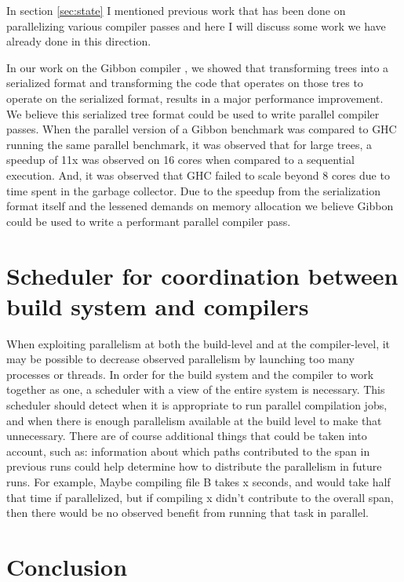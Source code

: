 \documentclass[10pt]{article}
\begin{document}

In section \ref{sec:state} I mentioned previous work that has been done on parallelizing various compiler
passes and here I will discuss some work we have already done in this direction. 

In our work on the Gibbon compiler \cite{vollmer2017compiling}, we showed that transforming trees into a serialized
format and transforming the code that operates on those tres to operate on the serialized format,
results in a major performance improvement.  We believe this serialized tree format could be used to
write parallel compiler passes.  When the parallel version of a Gibbon benchmark was compared to
GHC running the same parallel benchmark, it was observed that for large trees, a speedup of
11x was observed on 16 cores when compared to a sequential execution.  And, it was observed that GHC
failed to scale beyond 8 cores due to time spent in the garbage collector.  Due to the speedup from
the serialization format itself and the lessened demands on memory allocation we believe Gibbon
could be used to write a performant parallel compiler pass.


\section{Scheduler for coordination between build system and compilers}

When exploiting parallelism at both the build-level and at the compiler-level, it may be possible to
decrease observed parallelism by launching too many processes or threads.  In order for the build
system and the compiler to work together as one, a scheduler with a view of the entire system
is necessary.  This scheduler should detect when it is appropriate to run parallel compilation
jobs, and when there is enough parallelism available at the build level to make that unnecessary.
There are of course additional things that could be taken into account, such as: information about which
paths contributed to the span in previous runs could help determine how
to distribute the parallelism in future runs.
For example, Maybe compiling file B takes x
seconds, and would take half that time if parallelized, but if compiling x didn't contribute to
the overall span, then there would be no observed benefit from running that task in parallel.

\section{Conclusion}
\end{document}
